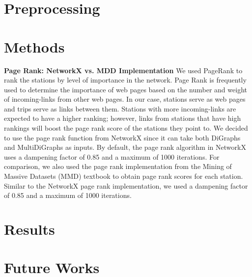 \documentclass{article}
\begin{document}
\section{Preprocessing}

\section{Methods}
\textbf{Page Rank: NetworkX vs. MDD Implementation}
\newline
We used PageRank to rank the stations by level of importance in the network. Page Rank is frequently used to determine the importance of web pages based on the number and weight of incoming-links from other web pages. In our case, stations serve as web pages and trips serve as links between them. Stations with more incoming-links are expected to have a higher ranking; however, links from stations that have high rankings will boost the page rank score of the stations they point to.
\newline
We decided to use the page rank function from NetworkX since it can take both DiGraphs and MultiDiGraphs as inputs. By default, the page rank algorithm in NetworkX uses a dampening factor of 0.85 and a maximum of 1000 iterations. For comparison, we also used the page rank implementation from the Mining of Massive Datasets (MMD) textbook to obtain page rank scores for each station. Similar to the NetworkX page rank implementation, we used a dampening factor of 0.85  and a maximum of 1000 iterations.


\section{Results}

\section{Future Works}
\end{document}
